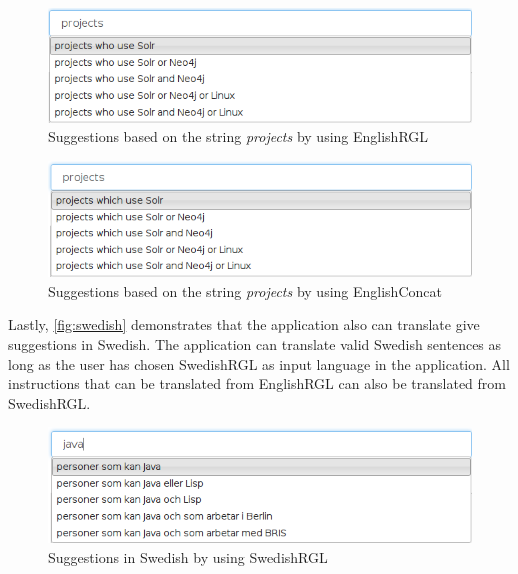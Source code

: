 \begin{figure}[H]
\includegraphics[scale=0.6,keepaspectratio,valign=t]{./gfx/projects-rgl.png}
\caption{Suggestions based on the string \emph{projects} by using EnglishRGL\label{fig:projects-rgl}}
\end{figure}

\begin{figure}[H]
\includegraphics[scale=0.6,keepaspectratio,valign=t]{./gfx/projects-concat.png}
\caption{Suggestions based on the string \emph{projects} by using EnglishConcat\label{fig:projects-concat}}
\end{figure}

Lastly, \autoref{fig:swedish} demonstrates that the application also can translate give suggestions in Swedish. The application can translate valid Swedish sentences as long as the user has chosen SwedishRGL as input language in the application. All instructions that can be translated from EnglishRGL can also be translated from SwedishRGL.

\begin{figure}[H]
\includegraphics[scale=0.6,keepaspectratio,valign=t]{./gfx/swedish.png}
\caption{Suggestions in Swedish by using SwedishRGL\label{fig:swedish}}
\end{figure}